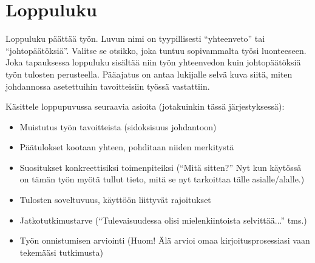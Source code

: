 
\section{Loppuluku}

Loppuluku päättää työn. Luvun nimi on tyypillisesti ``yhteenveto'' tai
``johtopäätöksiä''. Valitse se otsikko, joka tuntuu sopivammalta työsi
luonteeseen. Joka tapauksessa loppuluku sisältää niin työn yhteenvedon
kuin johtopäätöksiä työn tulosten perusteella. Pääajatus on antaa
lukijalle selvä kuva siitä, miten johdannossa asetettuihin
tavoitteisiin työssä vastattiin.

Käsittele loppupuvussa seuraavia asioita (jotakuinkin tässä järjestyksessä):
%
\begin{itemize}
  \item Muistutus työn tavoitteista (sidoksisuus johdantoon)
  \item Päätulokset kootaan yhteen, pohditaan niiden merkitystä
  \item Suositukset konkreettisiksi toimenpiteiksi (``Mitä sitten?'' 
Nyt kun käytössä on tämän työn myötä tullut tieto, 
mitä se nyt tarkoittaa tälle asialle/alalle.)
  \item Tulosten soveltuvuus, käyttöön liittyvät rajoitukset
  \item Jatkotutkimustarve 
(``Tulevaisuudessa olisi mielenkiintoista selvittää...'' tms.)
  \item Työn onnistumisen arviointi 
(Huom! Älä arvioi omaa kirjoitusprosessiasi vaan tekemääsi tutkimusta)
\end{itemize}


